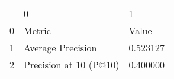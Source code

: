 \begin{tabular}{lll}
 & 0 & 1 \\
0 & Metric & Value \\
1 & Average Precision & 0.523127 \\
2 & Precision at 10 (P@10) & 0.400000 \\
\end{tabular}
